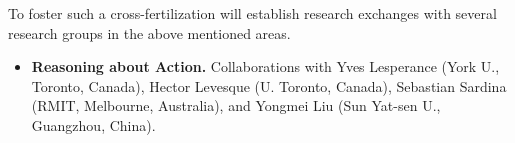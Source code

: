 To foster such a cross-fertilization \project  will establish research exchanges with several research groups in the above mentioned areas.
 \begin{itemize}
\item \textbf{Reasoning about Action.}
Collaborations with Yves Lesperance (York U., Toronto, Canada), Hector
Levesque (U. Toronto, Canada), Sebastian Sardina (RMIT, Melbourne,
Australia), and Yongmei Liu (Sun Yat-sen U., Guangzhou, China).


\end{itemize}
